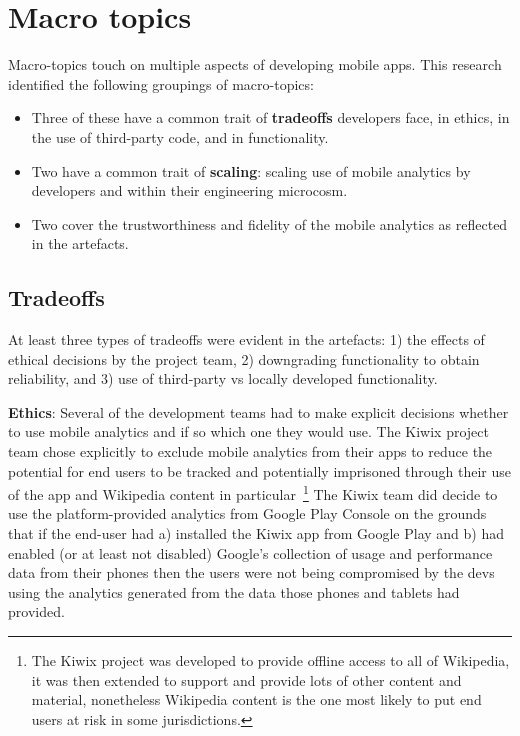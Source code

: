 \FloatBarrier


\section{Macro topics}
Macro-topics touch on multiple aspects of developing mobile apps. This research identified the following groupings of macro-topics:

\begin{itemize}
    \item Three of these have a common trait of \textbf{tradeoffs} developers face, in ethics, in the use of third-party code, and in functionality.
    \item Two have a common trait of \textbf{scaling}: scaling use of mobile analytics by developers and within their engineering microcosm.
    \item Two cover the trustworthiness and fidelity of the mobile analytics as reflected in the artefacts. 
\end{itemize}

\subsection{Tradeoffs}
At least three types of tradeoffs were evident in the artefacts: 1) the effects of ethical decisions by the project team, 2) downgrading functionality to obtain reliability, and 3) use of third-party vs locally developed functionality. 

\textbf{Ethics}: 
Several of the development teams had to make explicit decisions whether to use mobile analytics and if so which one they would use. The Kiwix project team chose explicitly to exclude mobile analytics from their apps to reduce the potential for end users to be tracked and potentially imprisoned through their use of the app and Wikipedia content in particular~\footnote{The Kiwix project was developed to provide offline access to all of Wikipedia, it was then extended to support and provide lots of other content and material, nonetheless Wikipedia content is the one most likely to put end users at risk in some jurisdictions.} The Kiwix team did decide to use the platform-provided analytics from Google Play Console on the grounds that if the end-user had a) installed the Kiwix app from Google Play and b) had enabled (or at least not disabled) Google's collection of usage and performance data from their phones then the users were not being compromised by the devs using the analytics generated from the data those phones and tablets had provided.

